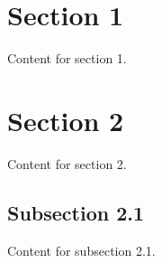 \documentclass{article}
\begin{document}
\tableofcontents

\section{Section 1}\label{section-1}

Content for section 1.

\section{Section 2}\label{section-2}

Content for section 2.

\subsection{Subsection 2.1}\label{subsection-21}

Content for subsection 2.1.
\end{document}
